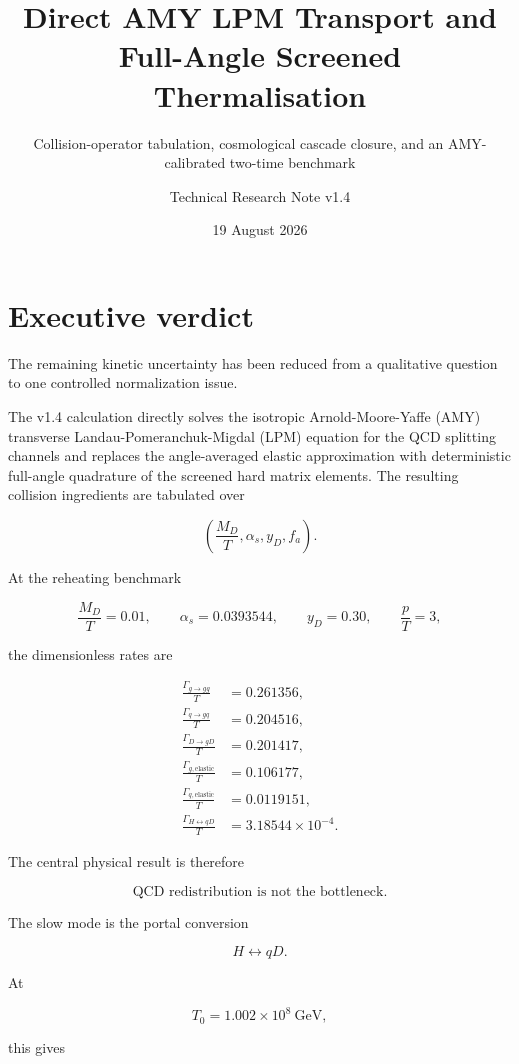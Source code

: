 \documentclass[
  10pt,
]{article}
\title{Direct AMY LPM Transport and Full-Angle Screened Thermalisation}
\subtitle{Collision-operator tabulation, cosmological cascade closure,
and an AMY-calibrated two-time benchmark}
\author{Technical Research Note v1.4}
\date{19 August 2026}
\begin{document}
\maketitle

{
\hypersetup{linkcolor=}
\setcounter{tocdepth}{3}
\tableofcontents
}
\section{Executive verdict}\label{executive-verdict}

The remaining kinetic uncertainty has been reduced from a qualitative
question to one controlled normalization issue.

The v1.4 calculation directly solves the isotropic Arnold-Moore-Yaffe
(AMY) transverse Landau-Pomeranchuk-Migdal (LPM) equation for the QCD
splitting channels and replaces the angle-averaged elastic approximation
with deterministic full-angle quadrature of the screened hard matrix
elements. The resulting collision ingredients are tabulated over

\[
\left(\frac{M_D}{T},\alpha_s,y_D,f_a\right).
\]

At the reheating benchmark

\[
\frac{M_D}{T}=0.01,
\qquad
\alpha_s=0.0393544,
\qquad
y_D=0.30,
\qquad
\frac{p}{T}=3,
\]

the dimensionless rates are

\[
\begin{aligned}
\frac{\Gamma_{g\to gg}}{T}&=0.261356,\\
\frac{\Gamma_{q\to gq}}{T}&=0.204516,\\
\frac{\Gamma_{D\to gD}}{T}&=0.201417,\\
\frac{\Gamma_{g,\mathrm{elastic}}}{T}&=0.106177,\\
\frac{\Gamma_{q,\mathrm{elastic}}}{T}&=0.0119151,\\
\frac{\Gamma_{H\leftrightarrow qD}}{T}&=3.18544\times10^{-4}.
\end{aligned}
\]

The central physical result is therefore

\[
\boxed{
\text{QCD redistribution is not the bottleneck.}
}
\]

The slow mode is the portal conversion

\[
H\leftrightarrow qD.
\]

At

\[
T_0=1.002\times10^8\ \mathrm{GeV},
\]

this gives
\end{document}
